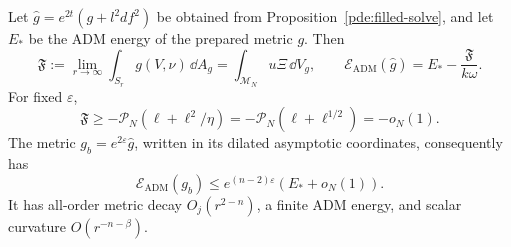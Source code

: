 \begin{proposition}
\label{pde:mass-cost}
Let \(\widehat g=e^{2t}(g+l^2df^2)\) be obtained from
Proposition~\ref{pde:filled-solve}, and let \(E_*\) be the ADM energy
of the prepared metric \(g\).  Then
\begin{equation}
 \mathfrak F
 :=\lim_{r\to\infty}\int_{S_r}g(V,\nu)\,\dd A_g
 =\int_{\mathcal M_N}u\Xi\,\dd V_g,\qquad
 \mathcal E_{\mathrm{ADM}}(\widehat g)
 =E_*-\frac{\mathfrak F}{k\omega}.
 \label{pde:mass-flux}
\end{equation}
For fixed \(\varepsilon\),
\begin{equation}
 \mathfrak F\ge
 -\mathcal P_N(\ell+\ell^2/\eta)
 =-\mathcal P_N(\ell+\ell^{1/2})=-o_N(1).
 \label{pde:mass-error}
\end{equation}
The metric \(g_b=e^{2\varepsilon}\widehat g\), written in its
dilated asymptotic coordinates, consequently has
\begin{equation}
 \mathcal E_{\mathrm{ADM}}(g_b)
 \le e^{(n-2)\varepsilon}(E_*+o_N(1)).
 \label{pde:base-mass}
\end{equation}
It has all-order metric decay \(O_j(r^{2-n})\), a finite ADM energy,
and scalar curvature \(O(r^{-n-\beta})\).
\end{proposition}

